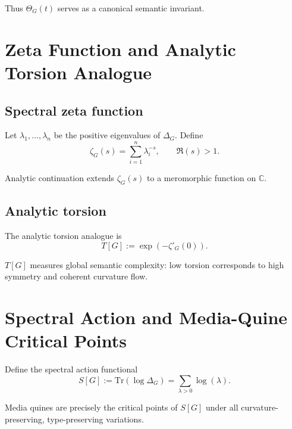 Thus $\Theta_G(t)$ serves as a canonical semantic invariant.

\section{Zeta Function and Analytic Torsion Analogue}

\subsection{Spectral zeta function}

\begin{definition}
Let $\lambda_1,\dots,\lambda_n$ be the positive eigenvalues of $\Delta_G$.
Define
\[
\zeta_G(s)
=
\sum_{i=1}^n \lambda_i^{-s},
\qquad \Re(s) > 1.
\]
\end{definition}

Analytic continuation extends $\zeta_G(s)$ to a meromorphic function on
$\mathbb{C}$.

\subsection{Analytic torsion}

\begin{definition}
The analytic torsion analogue is
\[
T[G] := \exp\left( -\zeta'_G(0) \right).
\]
\end{definition}

$T[G]$ measures global semantic complexity:  
low torsion corresponds to high symmetry and coherent curvature flow.

\section{Spectral Action and Media-Quine Critical Points}

Define the spectral action functional
\[
S[G] := \mathrm{Tr}(\log \Delta_G)
= \sum_{\lambda>0} \log(\lambda).
\]

\begin{theorem}
Media quines are precisely the critical points of $S[G]$ under all
curvature-preserving, type-preserving variations.
\end{theorem}

